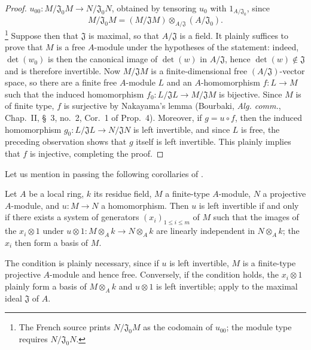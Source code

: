 \begin{proof}
$u_{00}:M/\mathfrak J_0M\to N/\mathfrak J_0N$, obtained by tensoring $u_0$ with $1_{A/\mathfrak J_0}$, since
\[
  M/\mathfrak J_0M=(M/\mathfrak JM)\otimes_{A/\mathfrak J}(A/\mathfrak J_0).
\]
\footnote{The French source prints $N/\mathfrak J_0M$ as the codomain of $u_{00}$; the module type requires $N/\mathfrak J_0N$.}
Suppose then that $\mathfrak J$ is maximal, so that $A/\mathfrak J$ is a field.
It plainly suffices to prove that $M$ is a free $A$-module under the hypotheses of the statement:
indeed, $\det(w_0)$ is then the canonical image of $\det(w)$ in $A/\mathfrak J$, hence $\det(w)\notin\mathfrak J$ and is therefore invertible.
Now $M/\mathfrak JM$ is a finite-dimensional free $(A/\mathfrak J)$-vector space, so there are a finite free $A$-module $L$ and an $A$-homomorphism $f:L\to M$ such that the induced homomorphism $f_0:L/\mathfrak JL\to M/\mathfrak JM$ is bijective.
Since $M$ is of finite type, $f$ is surjective by Nakayama's lemma (Bourbaki, \emph{Alg. comm.}, Chap.~II, \S~3, no.~2, Cor.~1 of Prop.~4).
Moreover, if $g=u\circ f$, then the induced homomorphism $g_0:L/\mathfrak JL\to N/\mathfrak JN$ is left invertible, and since $L$ is free, the preceding observation shows that $g$ itself is left invertible.
This plainly implies that $f$ is injective, completing the proof.
\end{proof}

Let us mention in passing the following corollaries of .

\begin{corollary}[19.1.11]
\label{0.19.1.11}
Let $A$ be a local ring, $k$ its residue field, $M$ a finite-type $A$-module, $N$ a projective $A$-module, and $u:M\to N$ a homomorphism.
Then $u$ is left invertible if and only if there exists a system of generators $(x_i)_{1\leq i\leq m}$ of $M$ such that the images of the $x_i\otimes1$ under $u\otimes1:M\otimes_Ak\to N\otimes_Ak$ are linearly independent in $N\otimes_Ak$;
the $x_i$ then form a basis of $M$.
\end{corollary}

The condition is plainly necessary, since if $u$ is left invertible, $M$ is a finite-type projective $A$-module and hence free.
Conversely, if the condition holds, the $x_i\otimes1$ plainly form a basis of $M\otimes_Ak$ and $u\otimes1$ is left invertible;
apply  to the maximal ideal $\mathfrak J$ of $A$.

